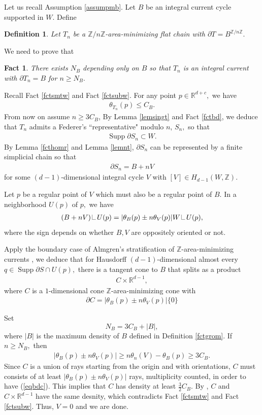 \documentclass[11pt,a4paper]{amsart}
\numberwithin{equation}{section}
\newcommand{\supp}{\operatorname{Supp}}
\newcommand\res{\mathop{\hbox{\vrule height 7pt width .3pt depth 0pt
			\vrule height .3pt width 5pt depth 0pt}}\nolimits}
\newcommand{\pd}{\partial}
\newcommand{\R}{\mathbb{R}}
\newcommand{\Z}{\mathbb{Z}}
\theoremstyle{plain}
\newtheorem{fact}{Fact}[subsection]
\newtheorem{defn}{Definition}[subsection]
\theoremstyle{definition}
\numberwithin{equation}{subsection}
\begin{document}
Let us recall Assumption \ref{assumpmb}. Let $B$ be an integral current cycle supported in $W$. Define
\begin{defn}
	Let $T_n$ be a $\Z/n\Z$-area-minimizing flat chain with $\pd T=B^{\Z/n\Z}.$
\end{defn}We need to prove that 
\begin{fact}
There exists $N_B$ depending only on $B$ so that	$T_n$ is an integral current with $\pd T_n=B$ for $n\ge N_B.$
\end{fact}  Recall Fact \ref{fctsmtw} and Fact \ref{fctsubw}. For any point $p\in\R^{d+c},$ we have
\begin{align*}
	\theta_{T_n}(p)\le C_{B}.
\end{align*}
From now on assume $n\ge 3C_B$, By Lemma \ref{lemsingt} and Fact \ref{fctbd}, we deduce that $T_n$ admits a Federer's ``representative" modulo $n$, $S_n,$ so that
\begin{align*}
	\supp\pd S_n\subset W.
\end{align*}
By Lemma \ref{fcthomr} and Lemma \ref{lemnt}, $\pd S_n$ can be represented by a finite simplicial chain so that
\begin{align*}
\pd	S_n=B+nV
\end{align*} for some $(d-1)$-dimensional integral cycle $V$ with $[V]\in H_{d-1}(W,\Z).$

Let $p$ be a regular point of $V$ which must also be a regular point of $B.$ In a neighborhood $U(p)$ of $p,$ we have
\begin{align*}
	(B+nV)\res U(p)=|\theta_B(p)\pm n\theta_V(p)|W\res U(p),
\end{align*} where the sign depends on whether $B,V$ are oppositely oriented or not.

Apply the boundary case of Almgren's stratification of $\Z$-area-minimizing currents \cite{BWst}, we deduce that for Hausdorff $(d-1)$-dimensional almost every $q\in\supp \pd S\cap U(p),$ there is a tangent cone to
$B$ that splits as a product
\begin{align*}
	C\times \R^{d-1},
\end{align*}
where $C$ is a $1$-dimensional cone $\Z$-area-minimizing cone with
\begin{align}\label{eqbdc}
	\pd C=|\theta_B(p)\pm n\theta_V(p)|\{0\}
\end{align}

Set $$N_B=3C_{B}+|B|,$$ where $|B|$ is the maximum density of $B$ defined in Definition \ref{fctgrom}. If $n\ge N_B,$ then
\begin{align*}
|\theta_B(p)\pm n\theta_V(p)|\ge n\theta_n(V)-\theta_B(p)\ge 3C_{B}.
\end{align*}
Since $C$ is a union of rays starting from the origin and with orientations, $C$ must consists of at least $|\theta_B(p)\pm n\theta_V(p)|$ rays, multiplicity counted, in order to have (\ref{eqbdc}). This implies that $C$ has density at least $\frac{3}{2}C_B$. By \cite[Section 3.3]{NWrs}, $C$ and $C\times \R^{d-1}$ have the same desnity, which contradicts Fact \ref{fctsmtw} and Fact \ref{fctsubw}. Thus, $V=0$ and we are done.
\end{document}
